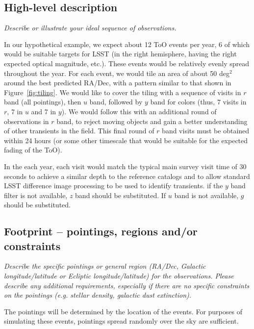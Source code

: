 \documentclass[11pt]{article}
\begin{document}
\subsection{High-level description}
\begin{footnotesize}
{\it Describe or illustrate your ideal sequence of observations.}
\end{footnotesize}

In our hypothetical example, we expect about 12 ToO events per year, 6 of which would be suitable targets for LSST (in the right hemisphere, 
having the right expected optical magnitude, etc.). These events would be relatively evenly spread throughout 
the year. For each event, we would tile an area of about 50 deg$^2$ around
the best predicted RA/Dec, with a pattern similar to that shown in Figure~\ref{fig:tiling}. We would like to cover
the tiling with a sequence of visits in $r$ band (all pointings), then $u$ band, followed by $y$ band for colors (thus, 7 visits in
$r$, 7 in $u$ and 7 in $y$).  We would follow this with an additional round of observations in $r$ band, to reject moving objects
and gain a better understanding of other transients in the field. This final round of $r$ band visits must be obtained within 24 hours
(or some other timescale that would be suitable for the expected fading of the ToO).  

In the each year, each visit would match the typical main survey visit time of 30 seconds to achieve a similar depth to the reference catalogs
and to allow standard LSST difference image processing to be used to identify transients. 
if the $y$ band filter is not available, $z$ band should be substituted. If $u$ band is not available, $g$ should be substituted.

\subsection{Footprint -- pointings, regions and/or constraints}
\begin{footnotesize}{\it Describe the specific pointings or general region (RA/Dec, Galactic longitude/latitude or 
Ecliptic longitude/latitude) for the observations. Please describe any additional requirements, especially if there
are no specific constraints on the pointings (e.g. stellar density, galactic dust extinction).}
\end{footnotesize}

The pointings will be determined by the location of the events. For purposes of simulating these events,
pointings spread randomly over the sky are sufficient. 
\end{document}
